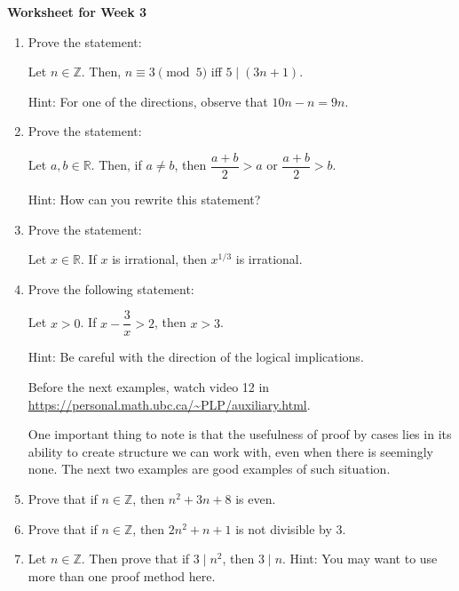 \documentclass[12pt]{article}
\begin{document}
\centerline{\bf\large Worksheet for Week 3}

\vspace{25pt}


\begin{enumerate}


\item  Prove the statement:
\begin{center}
Let $n\in\mathbb Z$. Then, $n\equiv 3 \pmod 5$ iff $5\mid (3n+1)$.
\end{center}
Hint: For one of the directions, observe that $10n-n=9n$.


\item Prove the statement:
\begin{center}
Let $a,b \in\mathbb R$. Then, if $a\neq b$, then $\dfrac{a+b}{2}>a$ or  $\dfrac{a+b}{2}>b$.
\end{center}	
Hint: How can you rewrite this statement?

\item Prove the statement:
\begin{center}
Let $x\in\mathbb R$. If $x$ is irrational, then $x^{1/3}$ is irrational.
\end{center}


\item Prove the following statement:
\begin{center}
Let $x>0$. If $x-\dfrac{3}{x}>2$, then $x>3$.
\end{center}
Hint: Be careful with the direction of the logical implications.

Before the next examples, watch video 12 in \url{https://personal.math.ubc.ca/~PLP/auxiliary.html}. 

One important thing to note is that the usefulness of proof by cases lies in its ability to create structure we can work with, even when there is seemingly none. The next two examples are good examples of such situation.

\item Prove that if $n\in\mathbb Z$, then $n^2+3n+8$ is even.

\item Prove that if $n\in\mathbb Z$, then $2n^2+n+1$ is not divisible by $3$.

\item Let $n\in\mathbb Z$. Then prove that if $3\mid n^2$, then $3\mid n$.
Hint: You may want to use more than one proof method here.


\end{enumerate}
\end{document}
